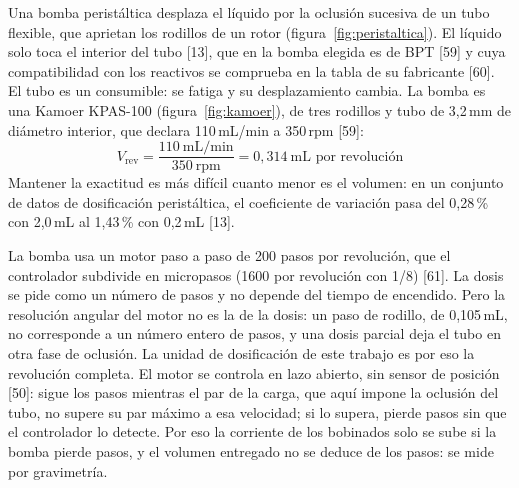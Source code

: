 Una bomba peristáltica desplaza el líquido por la oclusión sucesiva de un tubo flexible, que aprietan los rodillos de un rotor (figura~\ref{fig:peristaltica}). El líquido solo toca el interior del tubo [13], que en la bomba elegida es de BPT [59] y cuya compatibilidad con los reactivos se comprueba en la tabla de su fabricante [60]. El tubo es un consumible: se fatiga y su desplazamiento cambia. La bomba es una Kamoer KPAS-100 (figura~\ref{fig:kamoer}), de tres rodillos y tubo de 3,2\,mm de diámetro interior, que declara 110\,mL/min a 350\,rpm [59]:
\begin{equation}
V_{\text{rev}}=\frac{110\ \text{mL/min}}{350\ \text{rpm}}=0{,}314\ \text{mL por revolución}\label{eq:vrev}
\end{equation}
Mantener la exactitud es más difícil cuanto menor es el volumen: en un conjunto de datos de dosificación peristáltica, el coeficiente de variación pasa del 0,28\,\% con 2,0\,mL al 1,43\,\% con 0,2\,mL [13].


La bomba usa un motor paso a paso de 200 pasos por revolución, que el controlador subdivide en micropasos (1600 por revolución con 1/8) [61]. La dosis se pide como un número de pasos y no depende del tiempo de encendido. Pero la resolución angular del motor no es la de la dosis: un paso de rodillo, de 0,105\,mL, no corresponde a un número entero de pasos, y una dosis parcial deja el tubo en otra fase de oclusión. La unidad de dosificación de este trabajo es por eso la revolución completa. El motor se controla en lazo abierto, sin sensor de posición [50]: sigue los pasos mientras el par de la carga, que aquí impone la oclusión del tubo, no supere su par máximo a esa velocidad; si lo supera, pierde pasos sin que el controlador lo detecte. Por eso la corriente de los bobinados solo se sube si la bomba pierde pasos, y el volumen entregado no se deduce de los pasos: se mide por gravimetría.

\begin{figure}[H]\centering
{}
\end{figure}

